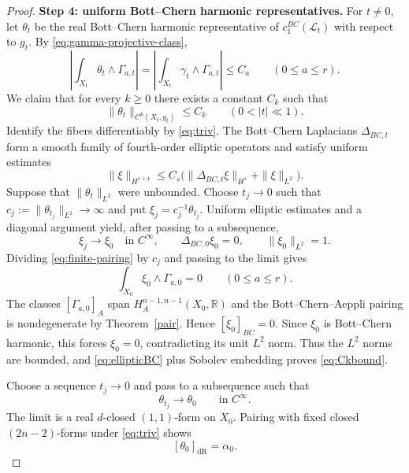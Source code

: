 \documentclass[11pt,letterpaper]{amsart}
\numberwithin{equation}{section}
\newcommand{\RR}{\mathbb{R}}
\newcommand{\cal}{\mathcal}
\def\cL{{\cal L}}
\begin{document}
\begin{proof}
\smallskip
\noindent\textbf{Step 4: uniform Bott--Chern harmonic representatives.}
For $t\ne0$, let $\theta_t$ be the real Bott--Chern harmonic representative
of $c_1^{BC}(\cL_t)$ with respect to $g_t$. By
\eqref{eq:gamma-projective-class},
\begin{equation}\label{eq:finite-pairing}
 \left|\int_{X_t}\theta_t\wedge\Gamma_{a,t}\right|
 =\left|\int_{X_t}\gamma_t\wedge\Gamma_{a,t}\right|
 \le C_a\qquad(0\le a\le r).
\end{equation}
We claim that for every $k\ge0$ there exists a constant $C_k$ such that
\begin{equation}\label{eq:Ckbound}
 \|\theta_t\|_{C^k(X_t,g_t)}\le C_k
 \qquad(0<|t|\ll1).
\end{equation}
Identify the fibers differentiably by \eqref{eq:triv}. The Bott--Chern
Laplacians $\Delta_{BC,t}$ form a smooth family of fourth-order elliptic
operators and satisfy uniform estimates
\begin{equation}\label{eq:ellipticBC}
 \|\xi\|_{H^{s+4}}
 \le C_s\bigl(\|\Delta_{BC,t}\xi\|_{H^s}+\|\xi\|_{L^2}\bigr).
\end{equation}
Suppose that $\|\theta_t\|_{L^2}$ were unbounded. Choose $t_j\to0$ such that
$c_j:=\|\theta_{t_j}\|_{L^2}\to\infty$ and put
$\xi_j=c_j^{-1}\theta_{t_j}$. Uniform elliptic estimates and a diagonal argument yield, after passing to a subsequence,
\[
 \xi_j\to\xi_0\quad\text{in }C^\infty,\qquad
 \Delta_{BC,0}\xi_0=0,\qquad
 \|\xi_0\|_{L^2}=1.
\]
Dividing \eqref{eq:finite-pairing} by $c_j$ and passing to the limit gives
\[
 \int_{X_0}\xi_0\wedge\Gamma_{a,0}=0\qquad(0\le a\le r).
\]
The classes $[\Gamma_{a,0}]_A$ span $H_A^{n-1,n-1}(X_0,\RR)$ and the
Bott--Chern--Aeppli pairing is nondegenerate by Theorem~\ref{pair}. Hence
$[\xi_0]_{BC}=0$. Since $\xi_0$ is Bott--Chern harmonic, this forces
$\xi_0=0$, contradicting its unit $L^2$ norm. Thus the $L^2$ norms are
bounded, and \eqref{eq:ellipticBC} plus Sobolev embedding proves
\eqref{eq:Ckbound}.

Choose a sequence $t_j\to0$ and pass to a subsequence such that
\begin{equation}\label{eq:theta-limit}
 \theta_{t_j}\to\theta_0\qquad\text{in }C^\infty.
\end{equation}
The limit is a real $d$-closed $(1,1)$-form on $X_0$. Pairing with fixed
closed $(2n-2)$-forms under \eqref{eq:triv} shows
\begin{equation}\label{eq:theta-class}
 [\theta_0]_{\mathrm{dR}}=\alpha_0.
\end{equation}


\end{proof}
\end{document}
